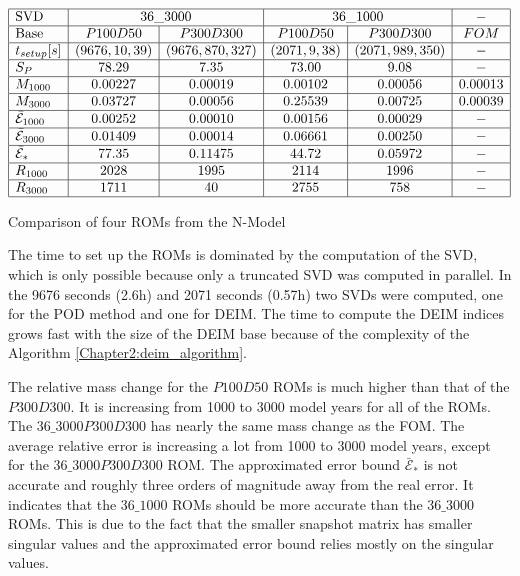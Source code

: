 \begin{table}[H]
\begin{center} 


$\begin{array}{|l|c|c|c|c|c|}
\hline
\text{SVD} & \multicolumn{2}{c|}{36\_3000} & \multicolumn{2}{c|}{36\_1000} & - \\
\hline
\text{Base}  & P100D50 & P300D300  & P100D50 & P300D300  & FOM\\
\hline t_{setup} [s]  & (9676,10,39) & (9676,870,327) & (2071,9,38) & (2071,989,350) & -\\

\hline S_P  & 78.29 & 7.35  & 73.00 & 9.08 & -\\

\hline M_{1000}  & 0.00227 & 0.00019  & 0.00102 & 0.00056 & 0.00013\\

\hline M_{3000}  & 0.03727 & 0.00056  & 0.25539 & 0.00725 & 0.00039\\

\hline \bar{\mathcal{E}}_{1000}  & 0.00252 & 0.00010  & 0.00156 & 0.00029 & -\\

\hline \bar{\mathcal{E}}_{3000}  & 0.01409 & 0.00014  & 0.06661 & 0.00250 & -\\

\hline \bar{\mathcal{E}}_{*}  & 77.35 & 0.11475  & 44.72 & 0.05972 & -\\

\hline R_{1000}  & 2028 & 1995  & 2114 & 1996 & -\\

\hline R_{3000}  & 1711 & 40  & 2755 & 758 & -\\
\hline
\end{array}$
\end{center}
\caption{Comparison of four ROMs from the N-Model}
 \label{Chapter4:table}
\end{table}
The time to set up the ROMs is dominated by the computation of the SVD, which is only possible because only a truncated SVD was computed in parallel.
In the 9676 seconds (2.6h)  and 2071 seconds (0.57h) two SVDs were computed, one for the POD method and one for DEIM. The time
to compute the DEIM indices grows fast with the size of the DEIM base because of the complexity of the Algorithm \ref{Chapter2:deim_algorithm}.

The relative mass change for the $P100D50$ ROMs is much higher than that of the $P300D300$. 
It is increasing from 1000 to 3000 model years for all of the ROMs.
The $36\_3000P300D300$ has nearly the same mass change as the FOM. 
The average relative error is increasing a lot from 1000 to 3000 model years, except for the $36\_3000P300D300$ ROM. The approximated error bound $\bar{\mathcal{E}}_{*}$ is not accurate and roughly three orders of magnitude away from the 
real error. It indicates that the $36\_1000$ ROMs should be more accurate than the $36\_3000$ ROMs. This is due to the fact that the smaller snapshot matrix has smaller singular values and the approximated error bound relies mostly 
on the singular values.

